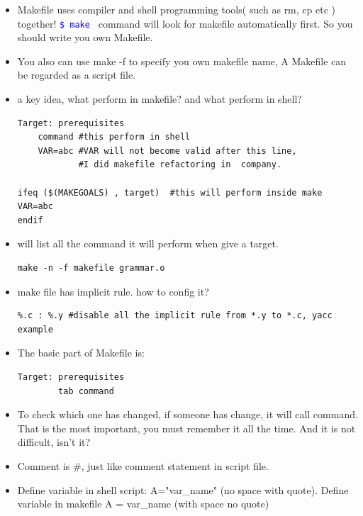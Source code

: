 \documentclass[a4paper,11pt,twoside]{book}
\newcommand{\linuxcommand}[1]{\texttt{\textcolor{blue}{\$ #1 \Pisymbol{psy}{191}}}}
\begin{document}
	\begin{itemize}
		\item Makefile uses compiler and shell programming tools( such as rm, cp etc ) together! \linuxcommand{make} command will look for makefile automatically first. So you should write you own Makefile.

		\item You also can use make -f to specify you own makefile name, A Makefile can be regarded as a script file.

		\item a key idea, what perform in makefile? and what perform in shell? 
\begin{verbatim}
Target: prerequisites
	command #this perform in shell
	VAR=abc #VAR will not become valid after this line,
	        #I did makefile refactoring in  company.

ifeq ($(MAKEGOALS) , target)  #this will perform inside make
VAR=abc
endif
\end{verbatim}

	\item will list all the command it will perform when give a target.
\begin{verbatim}
make -n -f makefile grammar.o
\end{verbatim}		

	\item make file has implicit rule. how to config it? 
\begin{verbatim}
%.c : %.y #disable all the implicit rule from *.y to *.c, yacc example
\end{verbatim}		

		\item The basic part of Makefile is:
\begin{verbatim}
Target: prerequisites
		tab command 
\end{verbatim}
				
										
		\item To check which one has changed, if someone has change, it will call command. That is the most important, you must remember it all the time.  And it is not difficult, isn't it?

		\item Comment is \#, just like comment statement in script file.
		
		\item Define variable in shell script: A="var\_name" (no space with quote). Define variable in makefile A = var\_name (with space no quote)


\end{itemize}
\end{document}
